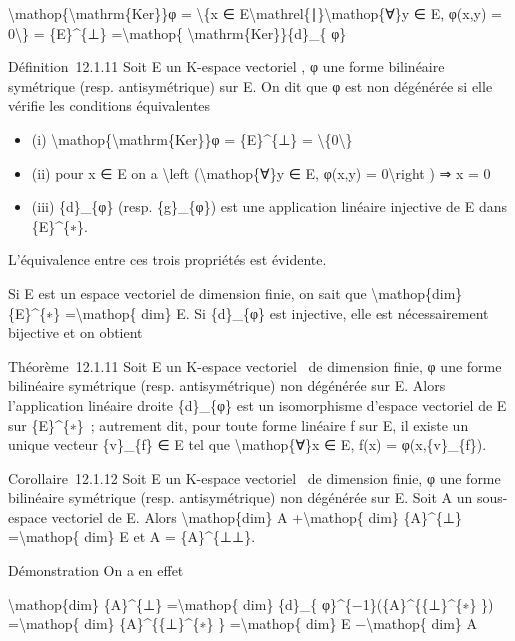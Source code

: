 \documentclass[]{article}
\begin{document}
\textbackslash{}mathop\{\textbackslash{}mathrm\{Ker\}\}φ =
\textbackslash{}\{x ∈
E\textbackslash{}mathrel\{∣\}\textbackslash{}mathop\{∀\}y ∈ E, φ(x,y) =
0\textbackslash{}\} = \{E\}\^{}\{⊥\} =\textbackslash{}mathop\{
\textbackslash{}mathrm\{Ker\}\}\{d\}\_\{ φ\}

Définition~12.1.11 Soit E un K-espace vectoriel , φ une forme bilinéaire
symétrique (resp. antisymétrique) sur E. On dit que φ est non dégénérée
si elle vérifie les conditions équivalentes

\begin{itemize}
\itemsep1pt\parskip0pt
\item
  (i) \textbackslash{}mathop\{\textbackslash{}mathrm\{Ker\}\}φ =
  \{E\}\^{}\{⊥\} = \textbackslash{}\{0\textbackslash{}\}
\item
  (ii) pour x ∈ E on a \textbackslash{}left
  (\textbackslash{}mathop\{∀\}y ∈ E, φ(x,y) = 0\textbackslash{}right ) ⇒
  x = 0
\item
  (iii) \{d\}\_\{φ\} (resp. \{g\}\_\{φ\}) est une application linéaire
  injective de E dans \{E\}\^{}\{∗\}.
\end{itemize}

L'équivalence entre ces trois propriétés est évidente.

Si E est un espace vectoriel de dimension finie, on sait que
\textbackslash{}mathop\{dim\} \{E\}\^{}\{∗\} =\textbackslash{}mathop\{
dim\} E. Si \{d\}\_\{φ\} est injective, elle est nécessairement
bijective et on obtient

Théorème~12.1.11 Soit E un K-espace vectoriel ~de dimension finie, φ une
forme bilinéaire symétrique (resp. antisymétrique) non dégénérée sur E.
Alors l'application linéaire droite \{d\}\_\{φ\} est un isomorphisme
d'espace vectoriel de E sur \{E\}\^{}\{∗\}~; autrement dit, pour toute
forme linéaire f sur E, il existe un unique vecteur \{v\}\_\{f\} ∈ E tel
que \textbackslash{}mathop\{∀\}x ∈ E, f(x) = φ(x,\{v\}\_\{f\}).

Corollaire~12.1.12 Soit E un K-espace vectoriel ~de dimension finie, φ
une forme bilinéaire symétrique (resp. antisymétrique) non dégénérée sur
E. Soit A un sous-espace vectoriel de E. Alors
\textbackslash{}mathop\{dim\} A +\textbackslash{}mathop\{ dim\}
\{A\}\^{}\{⊥\} =\textbackslash{}mathop\{ dim\} E et A = \{A\}\^{}\{⊥⊥\}.

Démonstration On a en effet

\textbackslash{}mathop\{dim\} \{A\}\^{}\{⊥\} =\textbackslash{}mathop\{
dim\} \{d\}\_\{ φ\}\^{}\{−1\}(\{A\}\^{}\{\{⊥\}\^{}\{∗\} \})
=\textbackslash{}mathop\{ dim\} \{A\}\^{}\{\{⊥\}\^{}\{∗\} \}
=\textbackslash{}mathop\{ dim\} E −\textbackslash{}mathop\{ dim\} A
\end{document}
